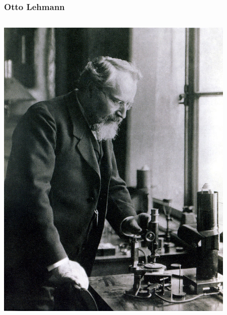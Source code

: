 \documentclass[14pt]{beamer}
\begin{document}
\begin{frame}
\begin{center}
\begin{columns}
\begin{column}{0.5\textwidth}
			\end{column}
		\end{columns}
		\vspace*{1em}
	\end{center}
\end{frame}

\begin{frame}
	\frametitle{Otto Lehmann}
	\begin{center}
		\begin{columns}
			\begin{column}{0.5\textwidth}
		\includegraphics[width=0.9\textwidth]{otto_lehmann.jpg}
			\end{column}
			\begin{column}{0.5\textwidth}

\end{column}
\end{columns}
\end{center}
\end{frame}
\end{document}
